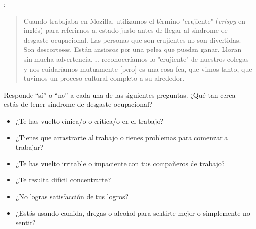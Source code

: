 
:

\begin{quote}
  Cuando trabajaba en Mozilla, 
  utilizamos el término "crujiente" (\emph{crispy} en inglés) para referirnos al estado justo antes de llegar al síndrome de desgaste ocupacional.
  Las personas que son crujientes no son divertidas.
  Son descorteses.
  Están ansiosos por una pelea que pueden ganar.
  Lloran sin mucha advertencia.
  {\ldots} reconoceríamos lo "crujiente" de nuestros colegas y nos cuidaríamos mutuamente 
  [pero] es una cosa fea, que vimos tanto, que tuvimos un proceso cultural completo a su alrededor.
\end{quote}

\noindent
Responde ``sí'' o ``no'' a cada una de las siguientes preguntas.
¿Qué tan cerca estás de tener síndrome de desgaste ocupacional?

\begin{itemize}
\item ¿Te has vuelto cínica/o o crítica/o en el trabajo?
\item ¿Tienes que arrastrarte al trabajo o tienes problemas para comenzar a trabajar?
\item ¿Te has vuelto irritable o impaciente con tus compañeros de trabajo?
\item ¿Te resulta difícil concentrarte?
\item ¿No logras satisfacción de tus logros?
\item ¿Estás usando comida, drogas o alcohol para sentirte mejor o simplemente no sentir?
\end{itemize}
